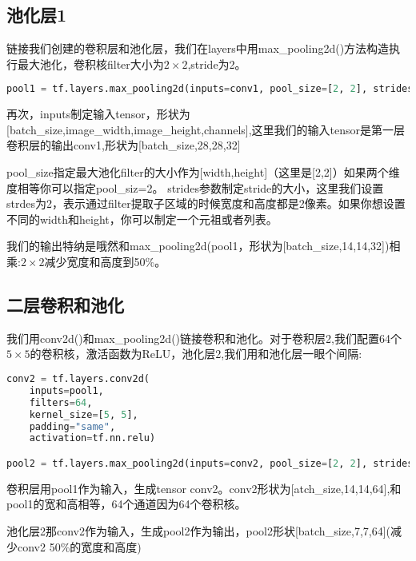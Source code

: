 \subsection{池化层1}
链接我们创建的卷积层和池化层，我们在layers中用max\_pooling2d()方法构造执行最大池化，卷积核filter大小为$2\times2$,stride为2。
\begin{lstlisting}[language=Python]
pool1 = tf.layers.max_pooling2d(inputs=conv1, pool_size=[2, 2], strides=2)
\end{lstlisting}
再次，inputs制定输入tensor，形状为[batch\_size,image\_width,image\_height,channels],这里我们的输入tensor是第一层卷积层的输出conv1,形状为[batch\_size,28,28,32]

pool\_size指定最大池化filter的大小作为[width,height]（这里是[2,2]）如果两个维度相等你可以指定pool\_siz=2。
strides参数制定stride的大小，这里我们设置strdes为2，表示通过filter提取子区域的时候宽度和高度都是2像素。如果你想设置不同的width和height，你可以制定一个元祖或者列表。

我们的输出特纳是哦然和max\_pooling2d(pool1，形状为[batch\_size,14,14,32])相乘:$2\times2$减少宽度和高度到50\%。
\subsection{二层卷积和池化}
我们用conv2d()和max\_pooling2d()链接卷积和池化。对于卷积层2,我们配置64个$5\times5$的卷积核，激活函数为ReLU，池化层2,我们用和池化层一眼个间隔:
\begin{lstlisting}[language=Python]
conv2 = tf.layers.conv2d(
    inputs=pool1,
    filters=64,
    kernel_size=[5, 5],
    padding="same",
    activation=tf.nn.relu)

pool2 = tf.layers.max_pooling2d(inputs=conv2, pool_size=[2, 2], strides=2)
\end{lstlisting}
卷积层用pool1作为输入，生成tensor conv2。conv2形状为[atch\_size,14,14,64],和pool1的宽和高相等，64个通道因为64个卷积核。

池化层2那conv2作为输入，生成pool2作为输出，pool2形状[batch\_size,7,7,64](减少conv2 50\%的宽度和高度)
